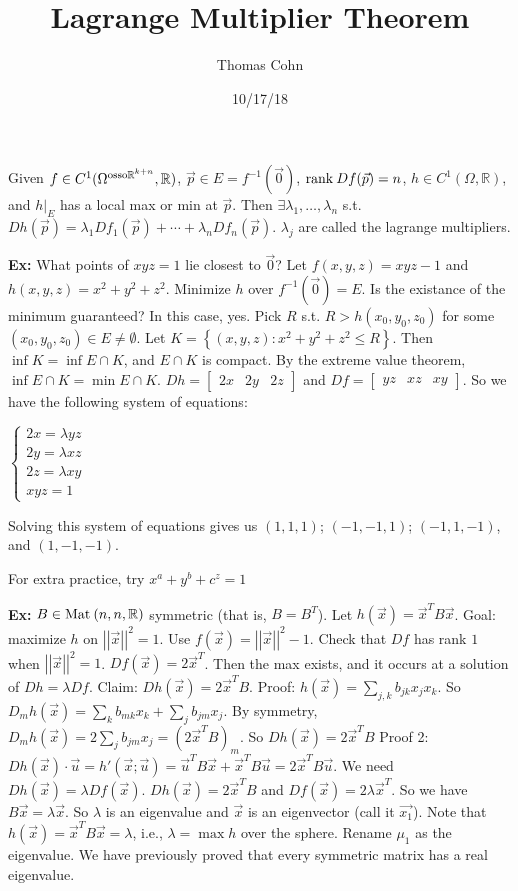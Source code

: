 \documentclass[10pt,letterpaper]{article}
\author{Thomas Cohn}
\title{Lagrange Multiplier Theorem}
\date{10/17/18} %
\newcommand{\n}{\hfill\break}
\newcommand{\ex}[1]{\par\noindent\settowidth{\hangindent}{\textbf{Ex: }}\textbf{Ex: }#1\n}
\newcommand{\ptxt}[1]{\textrm{\textnormal{#1}}}
\newcommand{\inlineeq}[1]{\centerline{$\displaystyle #1$}}
\newcommand{\set}[1]{\left\{#1\right\}}
\newcommand{\reals}{\mathbb{R}}
\newcommand{\R}{\reals}
\newcommand{\inv}{^{-1}}
\newcommand{\abs}[1]{\left|#1\right|}
\newcommand{\norm}[1]{\abs{\abs{#1}}}
\newcommand{\tpose}{^{T}}
\newcommand{\Mat}{\ptxt{Mat}\>}
\newcommand{\rank}{\ptxt{rank}\>}
\newcommand{\st}{s.t.}
\begin{document}
\maketitle
\setlength\RaggedRightParindent{\parindent}
\RaggedRight

\par\noindent Given $f\in{}C^{1}(\Omega^{\ptxt{osso}\R^{k+n}},\R)$, $\vec{p}\in{}E=f\inv(\vec{0})$, $\rank{}Df(\vec{p})=n$, $h\in{}C^{1}(\Omega,\R)$, and $h|_{E}$ has a local max or min at $\vec{p}$.\n
Then $\exists\lambda_{1},\ldots,\lambda_{n}$ \st{} $Dh(\vec{p})=\lambda_{1}Df_{1}(\vec{p})+\cdots+\lambda_{n}Df_{n}(\vec{p})$. $\lambda_{j}$ are called the lagrange multipliers.\n

\ex{What points of $xyz=1$ lie closest to $\vec{0}$?\n
Let $f(x,y,z)=xyz-1$ and $h(x,y,z)=x^{2}+y^{2}+z^{2}$. Minimize $h$ over $f\inv(\vec{0})=E$.\n
\n
Is the existance of the minimum guaranteed? In this case, yes. Pick $R$ \st{} $R>h(x_{0},y_{0},z_{0})$ for some $(x_{0},y_{0},z_{0})\in{}E\ne\emptyset$. Let $K=\set{(x,y,z):x^{2}+y^{2}+z^{2}\le{}R}$. Then $\inf{}K=\inf{}E\cap{}K$, and $E\cap{}K$ is compact. By the extreme value theorem, $\inf{}E\cap{}K=\min{}E\cap{}K$.\n
\n
$Dh=\left[\begin{array}{lll}2x & 2y & 2z\end{array}\right]$ and $Df=\left[\begin{array}{lll}yz & xz & xy\end{array}\right]$. So we have the following system of equations:\n
\inlineeq{\left\{\begin{array}{l}2x=\lambda{}yz\\ 2y=\lambda{}xz\\ 2z=\lambda{}xy\\ xyz=1\end{array}\right.}
Solving this system of equations gives us $(1,1,1)$; $(-1,-1,1)$; $(-1,1,-1)$, and $(1,-1,-1)$.}

\par\noindent For extra practice, try $x^{a}+y^{b}+c^{z}=1$\n

\ex{$B\in\Mat(n,n,\R)$ symmetric (that is, $B=B\tpose$).\n
Let $h(\vec{x})=\vec{x}\tpose{}B\vec{x}$. Goal: maximize $h$ on $\norm{\vec{x}}^{2}=1$. Use $f(\vec{x})=\norm{\vec{x}}^{2}-1$.\n
\n
Check that $Df$ has rank $1$ when $\norm{\vec{x}}^{2}=1$. $Df(\vec{x})=2\vec{x}\tpose$. Then the max exists, and it occurs at a solution of $Dh=\lambda{}Df$.\n
\n
Claim: $Dh(\vec{x})=2\vec{x}\tpose{}B$.\n
Proof: $h(\vec{x})=\sum_{j,k}b_{jk}x_{j}x_{k}$. So $D_{m}h(\vec{x})=\sum_{k}b_{mk}x_{k}+\sum_{j}b_{jm}x_{j}$.\n
By symmetry, $D_{m}h(\vec{x})=2\sum_{j}b_{jm}x_{j}=(2\vec{x}\tpose{}B)_{m}$. So $Dh(\vec{x})=2\vec{x}\tpose{}B$\n
Proof 2: $Dh(\vec{x})\cdot\vec{u}=h'(\vec{x};\vec{u})=\vec{u}\tpose{}B\vec{x}+\vec{x}\tpose{}B\vec{u}=2\vec{x}\tpose{}B\vec{u}$.\n
\n
We need $Dh(\vec{x})=\lambda{}Df(\vec{x})$. $Dh(\vec{x})=2\vec{x}\tpose{}B$ and $Df(\vec{x})=2\lambda\vec{x}\tpose$. So we have $B\vec{x}=\lambda\vec{x}$. So $\lambda$ is an eigenvalue and $\vec{x}$ is an eigenvector (call it $\vec{x_{1}}$).\n
\n
Note that $h(\vec{x})=\vec{x}\tpose{}B\vec{x}=\lambda$, i.e., $\lambda=\max{}h$ over the sphere. Rename $\mu_{1}$ as the eigenvalue.\n
\n
We have previously proved that every symmetric matrix has a real eigenvalue.}
\end{document}
